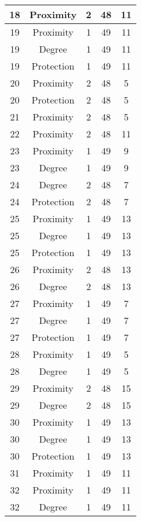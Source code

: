 \documentclass[results.tex]{subfiles}
\begin{document}
\begin{center}
\begin{tabular}{| c || c | c | c | c |}
    \hline
    18 & Proximity & 2 & 48 & 11 \\ 
    \hline
    19 & Proximity & 1 & 49 & 11 \\ 
    \hline
    19 & Degree & 1 & 49 & 11 \\ 
    \hline
    19 & Protection & 1 & 49 & 11 \\ 
    \hline
    20 & Proximity & 2 & 48 & 5 \\ 
    \hline
    20 & Protection & 2 & 48 & 5 \\ 
    \hline
    21 & Proximity & 2 & 48 & 5 \\ 
    \hline
    22 & Proximity & 2 & 48 & 11 \\ 
    \hline
    23 & Proximity & 1 & 49 & 9 \\ 
    \hline
    23 & Degree & 1 & 49 & 9 \\ 
    \hline
    24 & Degree & 2 & 48 & 7 \\ 
    \hline
    24 & Protection & 2 & 48 & 7 \\ 
    \hline
    25 & Proximity & 1 & 49 & 13 \\ 
    \hline
    25 & Degree & 1 & 49 & 13 \\ 
    \hline
    25 & Protection & 1 & 49 & 13 \\ 
    \hline
    26 & Proximity & 2 & 48 & 13 \\ 
    \hline
    26 & Degree & 2 & 48 & 13 \\ 
    \hline
    27 & Proximity & 1 & 49 & 7 \\ 
    \hline
    27 & Degree & 1 & 49 & 7 \\ 
    \hline
    27 & Protection & 1 & 49 & 7 \\ 
    \hline
    28 & Proximity & 1 & 49 & 5 \\ 
    \hline
    28 & Degree & 1 & 49 & 5 \\ 
    \hline
    29 & Proximity & 2 & 48 & 15 \\ 
    \hline
    29 & Degree & 2 & 48 & 15 \\ 
    \hline
    30 & Proximity & 1 & 49 & 13 \\ 
    \hline
    30 & Degree & 1 & 49 & 13 \\ 
    \hline
    30 & Protection & 1 & 49 & 13 \\ 
    \hline
    31 & Proximity & 1 & 49 & 11 \\ 
    \hline
    32 & Proximity & 1 & 49 & 11 \\ 
    \hline
    32 & Degree & 1 & 49 & 11 \\ 

\end{tabular}
\end{center}
\end{document}
